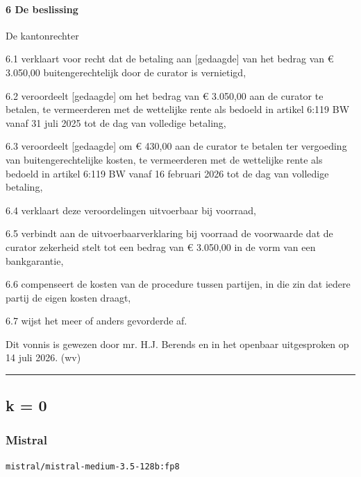 \documentclass[
  dutch,
  a4paper,
]{article}
\begin{document}
\paragraph{6 De beslissing}\label{de-beslissing-3}

De kantonrechter

6.1 verklaart voor recht dat de betaling aan {[}gedaagde{]} van het bedrag van € 3.050,00 buitengerechtelijk door de curator is vernietigd,

6.2 veroordeelt {[}gedaagde{]} om het bedrag van € 3.050,00 aan de curator te betalen, te vermeerderen met de wettelijke rente als bedoeld in artikel 6:119 BW vanaf 31 juli 2025 tot de dag van volledige betaling,

6.3 veroordeelt {[}gedaagde{]} om € 430,00 aan de curator te betalen ter vergoeding van buitengerechtelijke kosten, te vermeerderen met de wettelijke rente als bedoeld in artikel 6:119 BW vanaf 16 februari 2026 tot de dag van volledige betaling,

6.4 verklaart deze veroordelingen uitvoerbaar bij voorraad,

6.5 verbindt aan de uitvoerbaarverklaring bij voorraad de voorwaarde dat de curator zekerheid stelt tot een bedrag van € 3.050,00 in de vorm van een bankgarantie,

6.6 compenseert de kosten van de procedure tussen partijen, in die zin dat iedere partij de eigen kosten draagt,

6.7 wijst het meer of anders gevorderde af.

Dit vonnis is gewezen door mr. H.J. Berends en in het openbaar uitgesproken op 14 juli 2026. (wv)

\begin{center}\rule{0.5\linewidth}{0.5pt}\end{center}

\newpage


\subsection{k = 0}\label{k-0-3}

\subsubsection{Mistral}\label{mistral-9}

\texttt{mistral/mistral-medium-3.5-128b:fp8}
\end{document}
